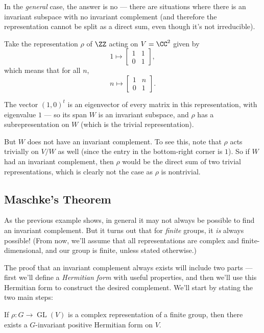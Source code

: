 In the \emph{general} case, the answer is no --- there are situations where there is an invariant subspace with no invariant complement (and therefore the representation cannot be split as a direct sum, even though it's not irreducible). 

\begin{example}
Take the representation $\rho$ of $\ZZ$ acting on $V = \CC^2$ given by \[1 \mapsto \begin{bmatrix} 1 & 1 \\ 0 & 1 \end{bmatrix},\] which means that for all $n$, \[n \mapsto \begin{bmatrix} 1 & n \\ 0 & 1 \end{bmatrix}.\] 

The vector $(1, 0)^t$ is an eigenvector of every matrix in this representation, with eigenvalue $1$ --- so its span $W$ is an invariant subspace, and $\rho$ has a subrepresentation on $W$ (which is the trivial representation). 

But $W$ does not have an invariant complement. To see this, note that $\rho$ acts trivially on $V/W$ as well (since the entry in the bottom-right corner is $1$). So if $W$ had an invariant complement, then $\rho$ would be the direct sum of two trivial representations, which is clearly not the case as $\rho$ is nontrivial. 
\end{example}

\subsection{Maschke's Theorem}

As the previous example shows, in general it may not always be possible to find an invariant complement. But it turns out that for \emph{finite} groups, it \emph{is} always possible! (From now, we'll assume that all representations are complex and finite-dimensional, and our group is finite, unless stated otherwise.)

The proof that an invariant complement always exists will include two parts --- first we'll define a \emph{Hermitian form} with useful properties, and then we'll use this Hermitian form to construct the desired complement. We'll start by stating the two main steps:

\begin{lemma} \label{hermitian exists}
If $\rho : G \to \operatorname{GL}(V)$ is a complex representation of a finite group, then there exists a $G$-invariant positive Hermitian form on $V$.
\end{lemma}

